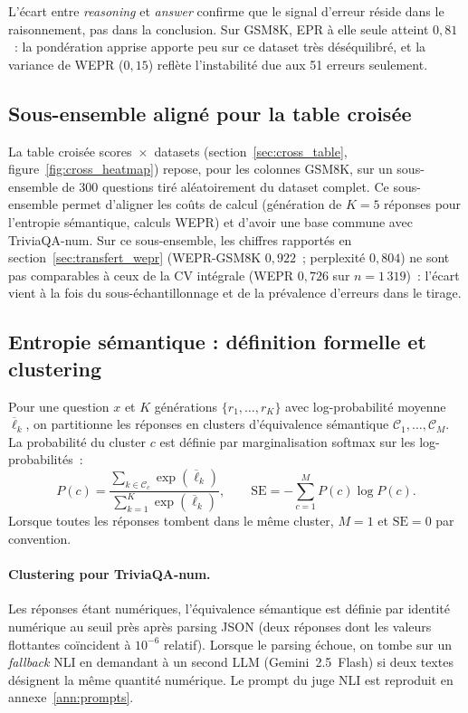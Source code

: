 \documentclass[12pt,a4paper]{article}
\begin{document}
L'écart entre \emph{reasoning} et \emph{answer} confirme que le signal d'erreur réside dans le raisonnement, pas dans la conclusion. Sur GSM8K, EPR à elle seule atteint $0{,}81$~: la pondération apprise apporte peu sur ce dataset très déséquilibré, et la variance de WEPR ($0{,}15$) reflète l'instabilité due aux 51 erreurs seulement.

\subsection{Sous-ensemble aligné pour la table croisée}

La table croisée scores~$\times$~datasets (section~\ref{sec:cross_table}, figure~\ref{fig:cross_heatmap}) repose, pour les colonnes GSM8K, sur un sous-ensemble de $300$ questions tiré aléatoirement du dataset complet. Ce sous-ensemble permet d'aligner les coûts de calcul (génération de $K=5$ réponses pour l'entropie sémantique, calculs WEPR) et d'avoir une base commune avec TriviaQA-num. Sur ce sous-ensemble, les chiffres rapportés en section~\ref{sec:transfert_wepr} (WEPR-GSM8K $0{,}922$~; perplexité $0{,}804$) ne sont pas comparables à ceux de la CV intégrale (WEPR $0{,}726$ sur $n=1\,319$)~: l'écart vient à la fois du sous-échantillonnage et de la prévalence d'erreurs dans le tirage.

\subsection{Entropie sémantique : définition formelle et clustering}

Pour une question $x$ et $K$ générations $\{r_1, \ldots, r_K\}$ avec log-probabilité moyenne $\overline{\ell}_k$, on partitionne les réponses en clusters d'équivalence sémantique $\mathcal{C}_1, \ldots, \mathcal{C}_M$. La probabilité du cluster $c$ est définie par marginalisation softmax sur les log-probabilités~:
\[
P(c) = \frac{\sum_{k \in \mathcal{C}_c} \exp(\overline{\ell}_k)}{\sum_{k=1}^{K} \exp(\overline{\ell}_k)},
\qquad
\mathrm{SE} = -\sum_{c=1}^{M} P(c) \log P(c).
\]
Lorsque toutes les réponses tombent dans le même cluster, $M = 1$ et $\mathrm{SE} = 0$ par convention.

\paragraph{Clustering pour TriviaQA-num.} Les réponses étant numériques, l'équivalence sémantique est définie par identité numérique au seuil près après parsing JSON (deux réponses dont les valeurs flottantes coïncident à $10^{-6}$ relatif). Lorsque le parsing échoue, on tombe sur un \emph{fallback} NLI en demandant à un second LLM (Gemini~2.5~Flash) si deux textes désignent la même quantité numérique. Le prompt du juge NLI est reproduit en annexe~\ref{ann:prompts}.
\end{document}
